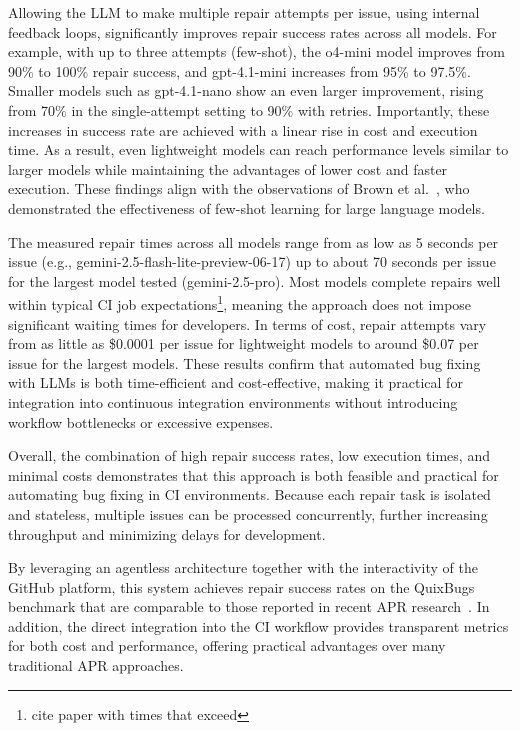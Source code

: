 Allowing the LLM to make multiple repair attempts per issue, using internal feedback loops, significantly improves repair success rates across all models. For example, with up to three attempts (few-shot), the o4-mini model improves from 90\% to 100\% repair success, and gpt-4.1-mini increases from 95\% to 97.5\%. Smaller models such as gpt-4.1-nano show an even larger improvement, rising from 70\% in the single-attempt setting to 90\% with retries. Importantly, these increases in success rate are achieved with a linear rise in cost and execution time. As a result, even lightweight models can reach performance levels similar to larger models while maintaining the advantages of lower cost and faster execution. These findings align with the observations of Brown et al.~\cite{brownLanguageModelsAre2020}, who demonstrated the effectiveness of few-shot learning for large language models.

The measured repair times across all models range from as low as 5 seconds per issue (e.g., gemini-2.5-flash-lite-preview-06-17) up to about 70 seconds per issue for the largest model tested (gemini-2.5-pro). Most models complete repairs well within typical CI job expectations\footnote{cite paper with times that exceed}, meaning the approach does not impose significant waiting times for developers. In terms of cost, repair attempts vary from as little as \$0.0001 per issue for lightweight models to around \$0.07 per issue for the largest models. These results confirm that automated bug fixing with LLMs is both time-efficient and cost-effective, making it practical for integration into continuous integration environments without introducing workflow bottlenecks or excessive expenses.

Overall, the combination of high repair success rates, low execution times, and minimal costs demonstrates that this approach is both feasible and practical for automating bug fixing in CI environments. Because each repair task is isolated and stateless, multiple issues can be processed concurrently, further increasing throughput and minimizing delays for development.

By leveraging an agentless architecture together with the interactivity of the GitHub platform, this system achieves repair success rates on the QuixBugs benchmark that are comparable to those reported in recent APR research~\cite{huCanGPTO1Kill2024, }. In addition, the direct integration into the CI workflow provides transparent metrics for both cost and performance, offering practical advantages over many traditional APR approaches.

